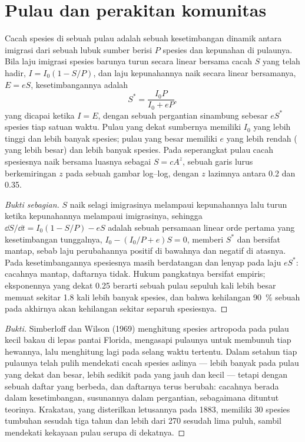 \section{Pulau dan perakitan komunitas}

\begin{theorem}\label{thm:b1:ecosystem-dynamics:island}
Cacah spesies di sebuah pulau adalah sebuah kesetimbangan dinamik
antara imigrasi dari sebuah lubuk sumber berisi $P$ spesies dan
kepunahan di pulaunya. Bila laju imigrasi spesies barunya turun secara
linear bersama cacah $S$ yang telah hadir, $I = I_0(1 - S/P)$, dan laju
kepunahannya naik secara linear bersamanya, $E = eS$, kesetimbangannya
adalah
\[
S^* = \frac{I_0 P}{I_0 + eP} ,
\]
yang dicapai ketika $I = E$, dengan sebuah pergantian sinambung
sebesar $eS^*$ spesies tiap satuan waktu. Pulau yang dekat sumbernya
memiliki $I_0$ yang lebih tinggi dan lebih banyak spesies; pulau yang
besar memiliki $e$ yang lebih rendah ( yang lebih besar) dan
lebih banyak spesies. Pada seperangkat pulau cacah spesiesnya naik
bersama luasnya sebagai $S = cA^z$, sebuah garis lurus berkemiringan
$z$ pada sebuah gambar log--log, dengan $z$ lazimnya antara \num{0.2}
dan \num{0.35}.
\end{theorem}
\begin{proof}[Bukti sebagian]
$S$ naik selagi imigrasinya melampaui kepunahannya lalu turun ketika
kepunahannya melampaui imigrasinya, sehingga $\dd S/\dd t = I_0(1 - S/P) - eS$
adalah sebuah persamaan linear orde pertama yang kesetimbangan
tunggalnya, $I_0 -
(I_0/P + e)S = 0$, memberi $S^*$ dan bersifat mantap, sebab laju
perubahannya positif di bawahnya dan negatif di atasnya. Pada
kesetimbangannya spesiesnya masih berdatangan dan lenyap pada laju
$eS^*$: cacahnya mantap, daftarnya tidak. Hukum pangkatnya bersifat
empiris; eksponennya yang dekat \num{0.25} berarti sebuah pulau sepuluh
kali lebih besar memuat sekitar \num{1.8} kali lebih banyak spesies,
dan bahwa kehilangan \qty{90}{\%} sebuah  pada akhirnya akan
kehilangan sekitar separuh spesiesnya.
\end{proof}
\begin{proof}[Bukti]
Simberloff dan Wilson (1969) menghitung spesies artropoda pada pulau
kecil bakau di lepas pantai Florida, mengasapi pulaunya untuk membunuh
tiap hewannya, lalu menghitung lagi pada selang waktu tertentu. Dalam
setahun tiap pulaunya telah pulih mendekati cacah spesies aslinya ---
lebih banyak pada pulau yang dekat dan besar, lebih sedikit pada yang
jauh dan kecil --- tetapi dengan sebuah daftar yang berbeda, dan
daftarnya terus berubah: cacahnya berada dalam kesetimbangan,
susunannya dalam pergantian, sebagaimana dituntut teorinya. Krakatau,
yang disterilkan letusannya pada 1883, memiliki \num{30} spesies
tumbuhan sesudah tiga tahun dan lebih dari \num{270} sesudah lima
puluh, sambil mendekati kekayaan pulau serupa di dekatnya.
\end{proof}

